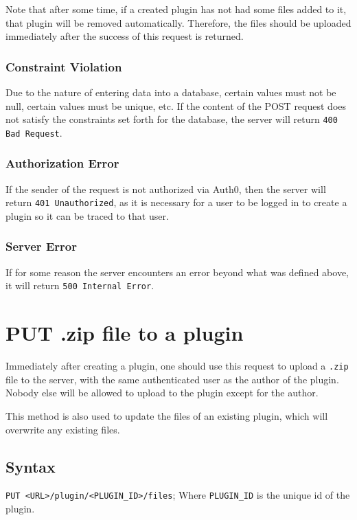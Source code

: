 \documentclass[a4paper, 12pt]{article}
\begin{document}
				

				Note that after some time, if a created plugin has not had some files added to it, that plugin will be removed automatically. Therefore, the files should be uploaded immediately after the success of this request is returned.

			\subsubsection{Constraint Violation}
				Due to the nature of entering data into a database, certain values must not be null, certain values must be unique, etc. If the content of the POST request does not satisfy the constraints set forth for the database, the server will return \verb|400 Bad Request|.

			\subsubsection{Authorization Error}
				If the sender of the request is not authorized via Auth0, then the server will return \verb|401 Unauthorized|, as it is necessary for a user to be logged in to create a plugin so it can be traced to that user.

			\subsubsection{Server Error}
				If for some reason the server encounters an error beyond what was defined above, it will return \verb|500 Internal Error|.

	\section{PUT .zip file to a plugin}
		Immediately after creating a plugin, one should use this request to upload a \verb|.zip| file to the server, with the same authenticated user as the author of the plugin. Nobody else will be allowed to upload to the plugin except for the author.

		This method is also used to update the files of an existing plugin, which will overwrite any existing files.

		\subsection{Syntax}
			\verb|PUT <URL>/plugin/<PLUGIN_ID>/files|; \footnotesize{Where \verb|PLUGIN_ID| is the unique id of the plugin.}
\end{document}
